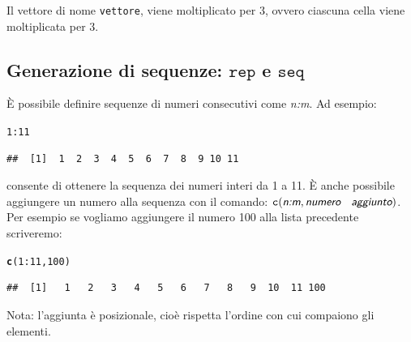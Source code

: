 \documentclass[onecolumn,11pt]{book}\usepackage[]{graphicx}\usepackage[]{color}
\makeatletter
\newcommand{\hlnum}[1]{\textcolor[rgb]{0.686,0.059,0.569}{#1}}%
\newcommand{\hlopt}[1]{\textcolor[rgb]{0,0,0}{#1}}%
\newcommand{\hlstd}[1]{\textcolor[rgb]{0.345,0.345,0.345}{#1}}%
\newcommand{\hlkwd}[1]{\textcolor[rgb]{0.737,0.353,0.396}{\textbf{#1}}}%
\newenvironment{kframe}{%
 \def\at@end@of@kframe{}%
 \ifinner\ifhmode%
  \def\at@end@of@kframe{\end{minipage}}%
  \begin{minipage}{\columnwidth}%
 \fi\fi%
 \def\FrameCommand##1{\hskip\@totalleftmargin \hskip-\fboxsep
 \colorbox{shadecolor}{##1}\hskip-\fboxsep
     \hskip-\linewidth \hskip-\@totalleftmargin \hskip\columnwidth}%
 \MakeFramed {\advance\hsize-\width
   \@totalleftmargin\z@ \linewidth\hsize
   \@setminipage}}%
 {\par\unskip\endMakeFramed%
 \at@end@of@kframe}
\newenvironment{knitrout}{}{} %
\newcommand{\varia}[1]{\textsl{\textsf{#1}}}
\makeatother
\begin{document}
Il vettore di nome \texttt{vettore}, viene moltiplicato per 3, ovvero ciascuna cella viene moltiplicata per 3.
\subsection{Generazione di sequenze: $\texttt{rep}$ e $\texttt{seq}$}
\`E possibile definire sequenze di numeri consecutivi come  \varia{n:m}.
Ad esempio:
\begin{knitrout}
\color{fgcolor}\begin{kframe}
\begin{alltt}
\hlnum{1}\hlopt{:}\hlnum{11}
\end{alltt}
\begin{verbatim}
##  [1]  1  2  3  4  5  6  7  8  9 10 11
\end{verbatim}
\end{kframe}
\end{knitrout}
consente di ottenere la sequenza dei numeri interi da 1 a 11. \`E anche possibile aggiungere un numero alla sequenza con il comando:
$\texttt{c}(\varia{n:m},\varia{numero \; aggiunto})$.
Per esempio se vogliamo aggiungere il numero 100 alla lista precedente scriveremo:
\begin{knitrout}
\color{fgcolor}\begin{kframe}
\begin{alltt}
\hlkwd{c}\hlstd{(}\hlnum{1}\hlopt{:}\hlnum{11}\hlstd{,}\hlnum{100}\hlstd{)}
\end{alltt}
\begin{verbatim}
##  [1]   1   2   3   4   5   6   7   8   9  10  11 100
\end{verbatim}
\end{kframe}
\end{knitrout}
Nota: l'aggiunta \`e posizionale, cio\`e rispetta l'ordine con cui compaiono gli elementi.
\end{document}
